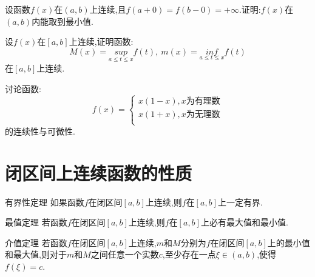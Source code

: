 \vspace{8cm}

\begin{example}
	设函数$f\left( x \right) $在$\left( a,b \right) $上连续,且$f\left( a+0 \right) =f\left( b-0 \right) =+\infty $.证明:$f\left( x \right) $在$\left( a,b \right) $内能取到最小值.
\end{example}

\vspace{8cm}

\begin{example}
	设$f\left( x \right) $在$\left[ a,b \right] $上连续,证明函数:
	$$
		M\left( x \right) =\underset{a\le t\le x}{sup}f\left( t \right) ,\ m\left( x \right) =\underset{a\le t\le x}{inf}f\left( t \right)
	$$
	在$\left[ a,b \right] $上连续.
\end{example}

\vspace{6cm}

\begin{example}
	讨论函数:
	$$
		f\left( x \right) =\left\{ \begin{array}{l}
			x\left( 1-x \right) ,x\text{为有理数} \\
			x\left( 1+x \right) ,x\text{为无理数} \\
		\end{array} \right.
	$$
	的连续性与可微性.
\end{example}

\vspace{6cm}

\section{闭区间上连续函数的性质}

\begin{theorem}{有界性定理}
	如果函数$f$在闭区间$\left[ a,b \right] $上连续,则$f$在$\left[ a,b \right] $上一定有界.
\end{theorem}

\begin{theorem}{最值定理}
	若函数$f$在闭区间$\left[ a,b \right] $上连续,则$f$在$\left[ a,b \right] $上必有最大值和最小值.
\end{theorem}

\begin{theorem}{介值定理}
	若函数$f$在闭区间$\left[ a,b \right] $上连续,$m$和$M$分别为$f$在闭区间$\left[ a,b \right] $上的最小值和最大值,则对于$m$和$M$之间任意一个实数$c$,至少存在一点$\xi \in \left( a,b \right) $,使得$f\left( \xi \right) =c$.
\end{theorem}


